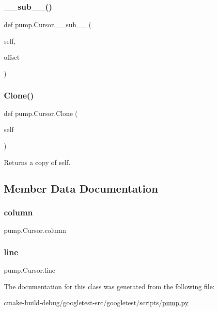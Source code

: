 \mbox{\label{classpump_1_1Cursor_a297cc8271af2aade66acb5fa5973a748}} 
\subsubsection{\texorpdfstring{\_\_sub\_\_()}{\_\_sub\_\_()}}
{\footnotesize\ttfamily def pump.\+Cursor.\+\_\+\+\_\+sub\+\_\+\+\_\+ (\begin{DoxyParamCaption}\item[{}]{self,  }\item[{}]{offset }\end{DoxyParamCaption})}

\mbox{\label{classpump_1_1Cursor_af68c9be83b0af87db441b21bc6ce8114}} 
\subsubsection{\texorpdfstring{Clone()}{Clone()}}
{\footnotesize\ttfamily def pump.\+Cursor.\+Clone (\begin{DoxyParamCaption}\item[{}]{self }\end{DoxyParamCaption})}

\begin{DoxyVerb}Returns a copy of self.\end{DoxyVerb}
 

\subsection{Member Data Documentation}
\mbox{\label{classpump_1_1Cursor_ae73db76c3a845a82afb334633864254e}} 
\subsubsection{\texorpdfstring{column}{column}}
{\footnotesize\ttfamily pump.\+Cursor.\+column}

\mbox{\label{classpump_1_1Cursor_aee8d8b67360da7fc4e635540cb41d48c}} 
\subsubsection{\texorpdfstring{line}{line}}
{\footnotesize\ttfamily pump.\+Cursor.\+line}



The documentation for this class was generated from the following file\+:\begin{DoxyCompactItemize}
\item 
cmake-\/build-\/debug/googletest-\/src/googletest/scripts/\mbox{\hyperlink{pump_8py}{pump.\+py}}\end{DoxyCompactItemize}
